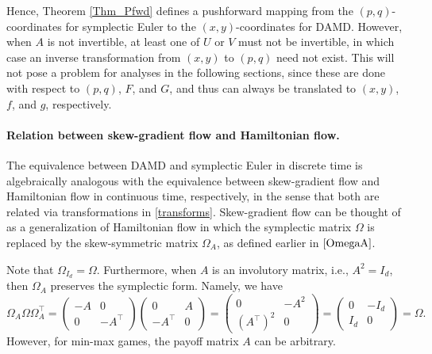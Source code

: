 \documentclass[11pt]{article}
\begin{document}
Hence, Theorem \ref{Thm_Pfwd} defines a pushforward mapping from the $(p,q)$-coordinates for symplectic Euler to the $(x,y)$-coordinates for DAMD. However, when $A$ is not invertible, at least one of $U$ or $V$ must not be invertible, in which case an inverse transformation from $(x,y)$ to $(p,q)$ need not exist. This will not pose a problem for analyses in the following sections, since these are done with respect to $(p,q)$, $F$, and $G$, and thus can always be translated to $(x,y)$, $f$, and $g$, respectively.

\paragraph{Relation between skew-gradient flow and Hamiltonian flow.}
The equivalence between DAMD and symplectic Euler in discrete time is algebraically analogous with the equivalence between skew-gradient flow \citep[e.g.,][]{Abernethy,Wibisono2022} and Hamiltonian flow in continuous time, respectively, in the sense that both are related via transformations in \eqref{transforms}. Skew-gradient flow can be thought of as a generalization of Hamiltonian flow in which the symplectic matrix $\Omega$ is replaced by the skew-symmetric matrix $\Omega_{A}$, as defined earlier in $\eqref{OmegaA}$.

Note that $\Omega_{I_{d}}=\Omega$.
Furthermore, when $A$ is an involutory matrix, i.e., $A^{2} = I_{d}$, then $\Omega_A$ preserves the symplectic form. Namely, we have
$$\Omega_A \Omega \Omega_A^\top =\begin{pmatrix}
    -A & 0 \\ 0 & -A^{\top}
\end{pmatrix}\begin{pmatrix}
    0 & A \\ -A^{\top} & 0
\end{pmatrix}=\begin{pmatrix}
    0 & -A^{2} \\ \left(A^{\top}\right)^{2} & 0
\end{pmatrix}=\begin{pmatrix}
    0 & -I_{d} \\ I_{d} & 0
\end{pmatrix}=
\Omega.$$ However, for min-max games, the payoff matrix $A$ can be arbitrary.
\end{document}
